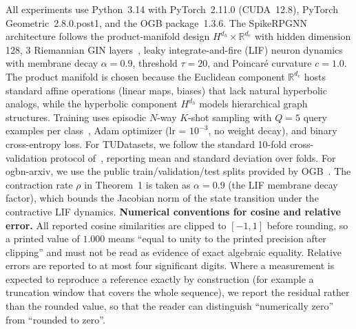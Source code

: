 \documentclass[a4paper,fleqn]{cas-dc}
\begin{document}
All experiments use Python~3.14 with PyTorch~2.11.0 (CUDA~12.8), PyTorch Geometric~2.8.0.post1, and the OGB package~1.3.6. The SpikeRPGNN architecture follows the product-manifold design $H^{d_h}\times\mathbb{R}^{d_e}$ with hidden dimension 128, 3 Riemannian GIN layers~\citep{Chami19}, leaky integrate-and-fire (LIF) neuron dynamics~\citep{Izhikevich04} with membrane decay $\alpha=0.9$, threshold $\tau=20$, and Poincar\'e curvature $c=1.0$. The product manifold is chosen because the Euclidean component $\mathbb{R}^{d_e}$ hosts standard affine operations (linear maps, biases) that lack natural hyperbolic analogs, while the hyperbolic component $H^{d_h}$ models hierarchical graph structures. Training uses episodic $N$-way $K$-shot sampling with $Q=5$ query examples per class~\citep{Sun24MSG}, Adam optimizer (lr = $10^{-3}$, no weight decay), and binary cross-entropy loss. For TUDatasets, we follow the standard 10-fold cross-validation protocol of~\citep{Xu19}, reporting mean and standard deviation over folds. For ogbn-arxiv, we use the public train/validation/test splits provided by OGB~\citep{hu2020open}. The contraction rate $\rho$ in Theorem~1 is taken as $\alpha=0.9$ (the LIF membrane decay factor), which bounds the Jacobian norm of the state transition under the contractive LIF dynamics.
\textbf{Numerical conventions for cosine and relative error.} All reported cosine similarities are clipped to $[-1,1]$ before rounding, so a printed value of $1.000$ means ``equal to unity to the printed precision after clipping'' and must not be read as evidence of exact algebraic equality. Relative errors are reported to at most four significant digits. Where a measurement is expected to reproduce a reference exactly by construction (for example a truncation window that covers the whole sequence), we report the residual rather than the rounded value, so that the reader can distinguish ``numerically zero'' from ``rounded to zero''.
\end{document}
